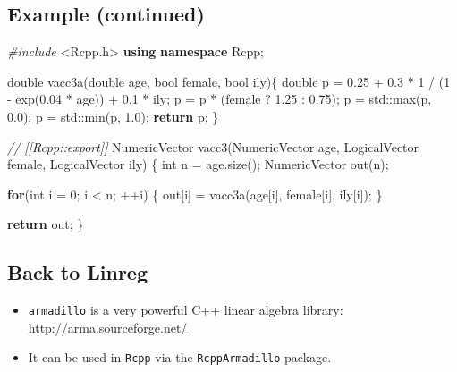 \documentclass[]{book}
\newenvironment{Shaded}{\begin{snugshade}}{\end{snugshade}}
\newcommand{\KeywordTok}[1]{\textcolor[rgb]{0.13,0.29,0.53}{\textbf{#1}}}
\newcommand{\DataTypeTok}[1]{\textcolor[rgb]{0.13,0.29,0.53}{#1}}
\newcommand{\DecValTok}[1]{\textcolor[rgb]{0.00,0.00,0.81}{#1}}
\newcommand{\FloatTok}[1]{\textcolor[rgb]{0.00,0.00,0.81}{#1}}
\newcommand{\ImportTok}[1]{#1}
\newcommand{\CommentTok}[1]{\textcolor[rgb]{0.56,0.35,0.01}{\textit{#1}}}
\newcommand{\ControlFlowTok}[1]{\textcolor[rgb]{0.13,0.29,0.53}{\textbf{#1}}}
\newcommand{\BuiltInTok}[1]{#1}
\newcommand{\PreprocessorTok}[1]{\textcolor[rgb]{0.56,0.35,0.01}{\textit{#1}}}
\newcommand{\NormalTok}[1]{#1}
\theoremstyle{definition}
\theoremstyle{definition}
\theoremstyle{definition}
\theoremstyle{remark}
\begin{document}
\subsection{Example (continued)}\label{example-continued}

\begin{Shaded}
\begin{Highlighting}[]
\PreprocessorTok{#include }\ImportTok{<Rcpp.h>}
\KeywordTok{using} \KeywordTok{namespace}\NormalTok{ Rcpp;}

\DataTypeTok{double}\NormalTok{ vacc3a(}\DataTypeTok{double}\NormalTok{ age, }\DataTypeTok{bool}\NormalTok{ female, }\DataTypeTok{bool}\NormalTok{ ily)\{}
  \DataTypeTok{double}\NormalTok{ p = }\FloatTok{0.25}\NormalTok{ + }\FloatTok{0.3}\NormalTok{ * }\DecValTok{1}\NormalTok{ / (}\DecValTok{1}\NormalTok{ - exp(}\FloatTok{0.04}\NormalTok{ * age)) + }\FloatTok{0.1}\NormalTok{ * ily;}
\NormalTok{  p = p * (female ? }\FloatTok{1.25}\NormalTok{ : }\FloatTok{0.75}\NormalTok{);}
\NormalTok{  p = }\BuiltInTok{std::}\NormalTok{max(p, }\FloatTok{0.0}\NormalTok{);}
\NormalTok{  p = }\BuiltInTok{std::}\NormalTok{min(p, }\FloatTok{1.0}\NormalTok{);}
  \ControlFlowTok{return}\NormalTok{ p;}
\NormalTok{\}}

\CommentTok{// [[Rcpp::export]]}
\NormalTok{NumericVector vacc3(NumericVector age, LogicalVector female, }
\NormalTok{                    LogicalVector ily) \{}
  \DataTypeTok{int}\NormalTok{ n = age.size();}
\NormalTok{  NumericVector out(n);}

  \ControlFlowTok{for}\NormalTok{(}\DataTypeTok{int}\NormalTok{ i = }\DecValTok{0}\NormalTok{; i < n; ++i) \{}
\NormalTok{    out[i] = vacc3a(age[i], female[i], ily[i]);}
\NormalTok{  \}}

  \ControlFlowTok{return}\NormalTok{ out;}
\NormalTok{\}}
\end{Highlighting}
\end{Shaded}

\subsection{Back to Linreg}\label{back-to-linreg}

\begin{itemize}
\item
  \texttt{armadillo} is a very powerful C++ linear algebra library:
  \url{http://arma.sourceforge.net/}
\item
  It can be used in \texttt{Rcpp} via the \texttt{RcppArmadillo}
  package.
\end{itemize}
\end{document}
